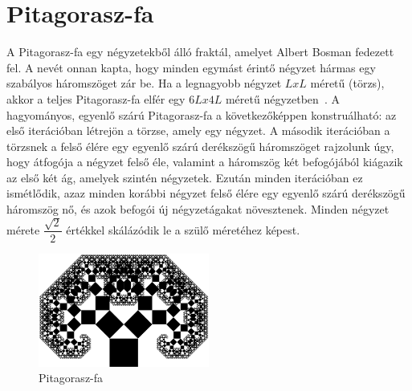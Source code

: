 \section{Pitagorasz-fa}
A Pitagorasz-fa egy négyzetekből álló fraktál, amelyet Albert Bosman fedezett fel. A nevét onnan kapta, hogy minden egymást érintő négyzet hármas egy szabályos háromszöget zár be. Ha a legnagyobb négyzet $L x L$ méretű (törzs), akkor a teljes Pitagorasz-fa elfér egy $6L x 4L$ méretű négyzetben~\cite{pitagorasz-fa}. A hagyományos, egyenlő szárú Pitagorasz-fa a következőképpen konstruálható: az első iterációban létrejön a törzse, amely egy négyzet. A második iterációban a törzsnek a felső élére egy egyenlő szárú derékszögű háromszöget rajzolunk úgy, hogy átfogója a négyzet felső éle, valamint a háromszög két befogójából kiágazik az első két ág, amelyek szintén négyzetek. Ezután minden iterációban ez ismétlődik, azaz minden korábbi négyzet felső élére egy egyenlő szárú derékszögű háromszög nő, és azok befogói új négyzetágakat növesztenek. Minden négyzet mérete $\dfrac{\sqrt{2}}{2}$ értékkel skálázódik le a szülő méretéhez képest.
\begin{figure}[!ht]
	\begin{center}
		\includegraphics[width=0.5\textwidth]{img/PythagorasTree}
		\caption[labelInTOC]{Pitagorasz-fa}
	\end{center}
\end{figure}


